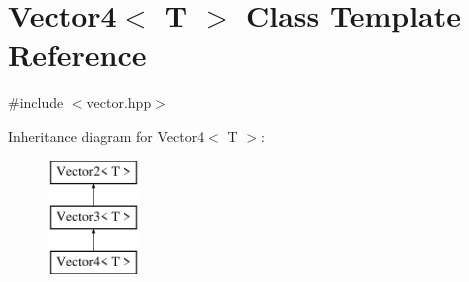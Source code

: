\hypertarget{class_vector4}{}\section{Vector4$<$ T $>$ Class Template Reference}
\label{class_vector4}


{\ttfamily \#include $<$vector.\+hpp$>$}

Inheritance diagram for Vector4$<$ T $>$\+:\begin{figure}[H]
\begin{center}
\leavevmode
\includegraphics[height=3.000000cm]{class_vector4}
\end{center}
\end{figure}
